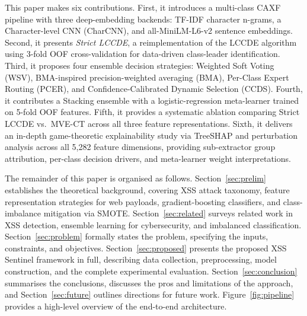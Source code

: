 \documentclass[11pt,a4paper]{article}
\begin{document}
This paper makes six contributions. First, it introduces a multi-class CAXF pipeline with three
deep-embedding backends: TF-IDF character n-grams, a Character-level CNN (CharCNN), and
all-MiniLM-L6-v2 sentence embeddings. Second, it presents \textit{Strict LCCDE}, a reimplementation
of the LCCDE algorithm using 3-fold OOF cross-validation for data-driven class-leader identification.
Third, it proposes four ensemble decision strategies: Weighted Soft Voting (WSV), BMA-inspired precision-weighted averaging (BMA), Per-Class Expert Routing (PCER), and Confidence-Calibrated Dynamic Selection (CCDS).
Fourth, it contributes a Stacking ensemble with a logistic-regression meta-learner trained on 5-fold
OOF features. Fifth, it provides a systematic ablation comparing Strict LCCDE vs.\ MVE-CT across all
three feature representations. Sixth, it delivers an in-depth game-theoretic explainability study via TreeSHAP and perturbation analysis across all 5,282 feature dimensions, providing sub-extractor group attribution, per-class decision drivers, and meta-learner weight interpretations.

The remainder of this paper is organised as follows. Section~\ref{sec:prelim} establishes the theoretical background, covering XSS attack taxonomy, feature representation strategies for web payloads, gradient-boosting classifiers, and class-imbalance mitigation via SMOTE. Section~\ref{sec:related} surveys related work in XSS detection, ensemble learning for cybersecurity, and imbalanced classification. Section~\ref{sec:problem} formally states the problem, specifying the inputs, constraints, and objectives. Section~\ref{sec:proposed} presents the proposed XSS Sentinel framework in full, describing data collection, preprocessing, model construction, and the complete experimental evaluation. Section~\ref{sec:conclusion} summarises the conclusions, discusses the pros and limitations of the approach, and Section~\ref{sec:future} outlines directions for future work. Figure~\ref{fig:pipeline} provides a high-level overview of the end-to-end architecture.

\end{document}
